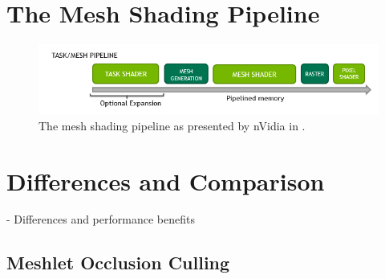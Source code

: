 



\section{The Mesh Shading Pipeline} \label{sec-mesh-shading-pipeline}


\begin{figure}[h]
    \centering
    \includegraphics[width=\linewidth]{images/graphics/mesh-rendering-pipeline.png}
    \caption{The mesh shading pipeline as presented by nVidia in \cite[Christoph Kubisch]{Kubisch2018}.}
    \label{fig:mesh-rendering-pipeline}
\end{figure}





\section{Differences and Comparison} \label{sec-differences-and-comparison}

- Differences and performance benefits

\subsection{Meshlet Occlusion Culling} \label{subsec-meshlet-occ-culling}

